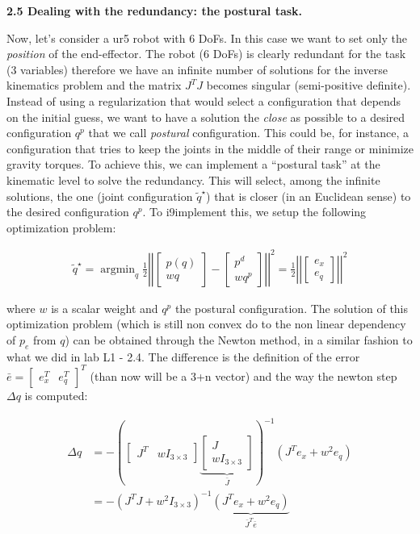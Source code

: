 \documentclass[11pt]{article}
\newcommand{\mat}[1]{\ensuremath{\begin{bmatrix}#1\end{bmatrix}}}	%
\DeclareMathOperator*{\argmin}{argmin}
\begin{document}
\textbf{2.5 Dealing with the redundancy: the postural task.} 

Now, let's consider a ur5 robot with 6 DoFs. In this case we want to set only the \textit{position} of the end-effector. The robot (6 DoFs) is clearly redundant for the task (3 variables) therefore we have an  infinite number of solutions for the inverse kinematics problem and the matrix $J^TJ$ becomes singular (semi-positive definite). Instead of using a regularization that would select a configuration that depends on the initial guess, we want to have a solution the  \textit{close} as possible to a desired configuration $q^p$ that we call \textit{postural} configuration. This could be, for instance, a configuration that tries to keep the joints in the middle of their range or minimize gravity torques. To achieve this,  we can implement a ``postural task'' at the kinematic level to solve the redundancy.
This will  select, among the infinite solutions, the one (joint configuration $\tilde{q}^\star$) that is closer (in an Euclidean sense) to the desired configuration $q^p$. 
To i9implement this, we setup the following optimization problem:

\begin{align*}
\tilde{q}^\star = \argmin_q \frac{1}{2} \left|\left| \mat{p(q) \\ w q } - \mat{p^d \\ w q^p }   \right|\right|^2 = \frac{1}{2} \left|\left| \mat{ e_x \\ e_q }   \right|\right|^2
\end{align*}

where $w$ is a scalar weight and $q^p$ the postural configuration. The solution of this optimization problem (which is still non convex do to the non linear dependency of $p_e$ from $q$) can be obtained through the Newton method, in a similar fashion to what we did in lab L1 - 2.4. The difference is the definition of the error $\bar{e} = \mat{e_x^T & e_q^T}^T$ (than now will be a 3+n vector) and the way the newton step $\Delta q$ is computed:


\begin{align*}
\Delta q &= -\left( \mat { J^T &  wI_{3 \times 3} } \underbrace{ \mat{J  \\ wI_{3 \times 3}}}_{\bar{J}} \right)^{-1} \left(J^T e_x + w^2e_q \right) \\
&= -\left( J^TJ + w^2I_{3 \times 3}\right)^{-1} \underbrace{ \left(J^T e_x + w^2 e_q \right) }_{\bar{J}^T\bar{e}}
\end{align*}
\end{document}
